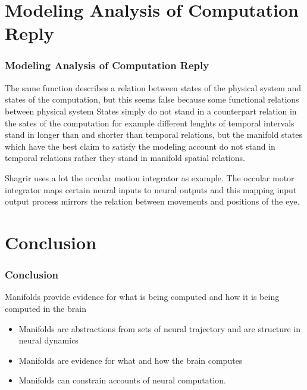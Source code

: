 \documentclass{beamer}
\begin{document}

\section{Modeling Analysis of Computation Reply}
\begin{frame}
\frametitle{\textbf{Modeling Analysis of Computation Reply} }

The same function describes a relation between states of the physical system and states of the computation, but this seems false because some functional relations between physical system States simply do not stand in a counterpart relation in the sates of the computation for example different lenghts of temporal intervals stand in longer than and shorter than temporal relations, but the manifold states which have the best claim to satisfy the modeling account do not stand in temporal relations rather they stand in manifold spatial relations.

Shagrir uses a lot the occular motion integrator as example. The occular motor integrator maps certain neural inputs to neural outputs and this mapping input output process mirrors the relation between movements and positions of the eye.


\end{frame}


\section{Conclusion}
\begin{frame}
\frametitle{Conclusion}

Manifolds provide evidence for what is being computed and how it is being computed in the brain 


\begin{itemize}
    \item Manifolds are abstractions from sets of neural trajectory and are structure in neural dynamics
    \item Manifolds are evidence for what and how the brain computes
    \item Manifolds can constrain accounts of neural computation.
\end{itemize}

\end{frame}
\end{document}
